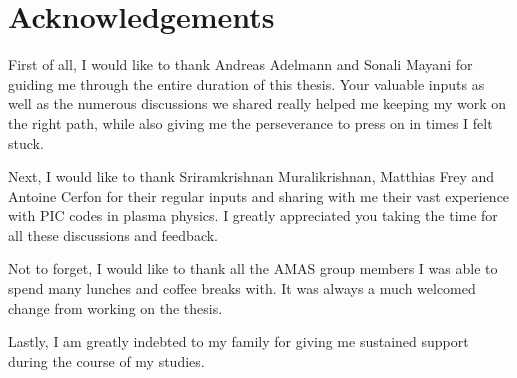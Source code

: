 \chapter*{Acknowledgements}

First of all, I would like to thank Andreas Adelmann and Sonali Mayani for guiding me through
the entire duration of this thesis.
Your valuable inputs as well as the numerous discussions we shared really helped me keeping my work
on the right path, while also giving me the perseverance to press on in times I felt stuck.

Next, I would like to thank Sriramkrishnan Muralikrishnan, Matthias Frey and Antoine Cerfon for
their regular inputs and sharing with me their vast experience with PIC codes in plasma physics. I
greatly appreciated you taking the time for all these discussions and feedback.

Not to forget, I would like to thank all the AMAS group members I was able to spend many lunches and coffee
breaks with. It was always a much welcomed change from working on the thesis.

Lastly, I am greatly indebted to my family for giving me sustained support during the course of my studies.
